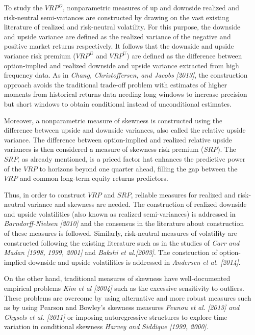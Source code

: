 \vspace{4mm}
To study the $VRP^D$, nonparametric measures of up and downside realized and risk-neutral semi-variances are constructed by drawing on the vast existing literature of realized and risk-neutral volatility. For this purpose, the downside and upside variance are defined as the realized variance of the negative and positive market returns respectively. It follows that the downside and upside variance risk premium ($VRP^D$ and $VRP^U$) are defined as the difference between option-implied and realized downside and upside variance extracted from high frequency data. As in \textit{Chang, Christoffersen, and Jacobs [2013]}, the construction approach avoids the traditional trade-off problem with estimates of higher moments from historical returns data needing long windows to increase precision but short windows to obtain conditional instead of unconditional estimates. 

\vspace{4mm}
Moreover, a nonparametric measure of skewness is constructed using the difference between upside and downside variances, also called the relative upside variance. The difference between option-implied and realized relative upside variances is then considered a measure of skewness risk premium ($SRP$).
The $SRP$, as already mentioned, is a priced factor hat enhances the predictive power of the $VRP$ to horizons beyond one quarter ahead, filling the gap between the $VRP$ and common long-term equity returns predictors.
 
 \vspace{4mm}
Thus, in order to construct $VRP$ and $SRP$, reliable measures for realized and risk-neutral variance and skewness are needed. The construction of realized downside and upside volatilities (also known as realized semi-variances) is addressed in \textit{Barndorff-Nielsen [2010]} and the consensus in the literature about construction of these measures is followed. Similarly, risk-neutral measures of volatility are constructed following the existing literature such as in the studies of \textit{Carr and Madan [1998, 1999, 2001]}  and\textit{ Bakshi et al.[2003]}. The construction of option-implied downside and upside volatilities is addressed in \textit{Andersen et al. [2014]}.

On the other hand, traditional measures of skewness have well-documented empirical problems \textit{Kim et al [2004]} such as the excessive sensitivity to outliers. These problems are overcome by using alternative and more robust measures such as by using Pearson and Bowley’s skewness measures \textit{Feunou et al. [2013] and Ghysels et al. [2011]} or imposing autoregressive structures to explore time variation in conditional skewness \textit{Harvey and Siddique [1999, 2000]}.


